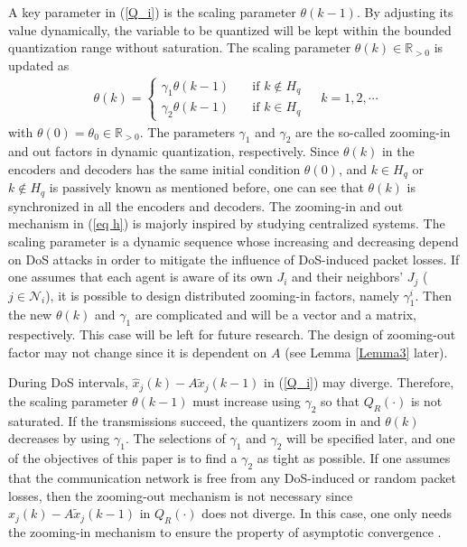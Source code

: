 \documentclass[letterpaper,journal,final,twocolumn]{IEEEtran}
\begin{document}
A key parameter in (\ref{Q_i}) is the scaling parameter $\theta (k-1)$. By adjusting its value dynamically, the variable to be quantized will be kept within the bounded quantization range without saturation. 
The scaling parameter $\theta(k) \in \mathbb{R}_{>0}$ is updated as
\begin{align}\label{eq h}
\theta(k) = 
\left\{
\begin{array}{ll}
\gamma_1 \theta(k-1) & \quad \text{if $k  \notin H_q $} \\
\gamma_2 \theta(k-1) & \quad \text{if $k  \in H_q $  }
\end{array}
\right.  \,\,\, k=1, 2, \cdots
\end{align}
with $\theta(0)  = \theta_0 \in \mathbb{R}_{>0}$. 
The parameters $\gamma_1$ and $\gamma_2$ are the so-called zooming-in and out factors in dynamic quantization, respectively. 
Since $\theta(k)$ in the encoders and decoders has the same initial condition $\theta(0)$, and $k \in H_q$ or $k \notin H_q$ is passively known as mentioned before, one can see that $\theta(k)$ is synchronized in all the encoders and decoders. 
The zooming-in and out mechanism in (\ref{eq h}) is majorly inspired by \cite{you2010minimum, feng2020tac} studying centralized systems. The scaling parameter is a dynamic sequence whose increasing and decreasing depend on DoS attacks in order to mitigate the influence of DoS-induced packet losses. 
If one assumes that each agent is aware of its own $J_i$ and their neighbors' $J_j$ ($j \in \mathcal N_i$), it is possible to design distributed zooming-in factors, namely $\gamma_1 ^ i$. Then the new $\theta(k)$ and $\gamma_1$ are complicated and will be a vector and a matrix, respectively. This case will be left for future research. The design of zooming-out factor may not change since it is dependent on $A$ (see Lemma \ref{Lemma3} later).

During DoS intervals, $\hat x_j(k) -  A \tilde x_j(k-1)$ in (\ref{Q_i}) may diverge. Therefore, the scaling parameter $\theta(k-1)$ must increase using $\gamma_2$ so that $Q_R(\cdot)$ is not saturated. If the transmissions succeed, the quantizers zoom in and $\theta(k)$ decreases by using $\gamma_1$.   
The selections of $\gamma_1$ and $\gamma_2$ will be specified later, and one of the objectives of this paper is to find a $\gamma_2$ as tight as possible. If one assumes that the communication network is free from any DoS-induced or random packet losses, then the zooming-out mechanism is not necessary since $\hat x_j(k) -  A \tilde x_j(k-1)$ in $Q_R(\cdot)$ does not diverge. In this case, one only needs the zooming-in mechanism to ensure the property of asymptotic convergence \cite{you2011network, 9429920}. 
\end{document}
